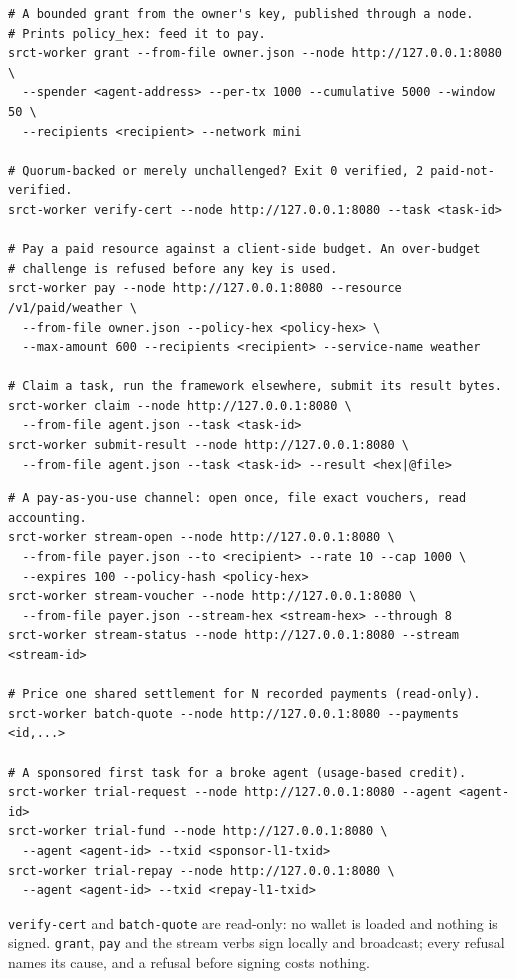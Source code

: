 \documentclass{article}
\begin{document}
\begin{verbatim}
# A bounded grant from the owner's key, published through a node.
# Prints policy_hex: feed it to pay.
srct-worker grant --from-file owner.json --node http://127.0.0.1:8080 \
  --spender <agent-address> --per-tx 1000 --cumulative 5000 --window 50 \
  --recipients <recipient> --network mini

# Quorum-backed or merely unchallenged? Exit 0 verified, 2 paid-not-verified.
srct-worker verify-cert --node http://127.0.0.1:8080 --task <task-id>

# Pay a paid resource against a client-side budget. An over-budget
# challenge is refused before any key is used.
srct-worker pay --node http://127.0.0.1:8080 --resource /v1/paid/weather \
  --from-file owner.json --policy-hex <policy-hex> \
  --max-amount 600 --recipients <recipient> --service-name weather

# Claim a task, run the framework elsewhere, submit its result bytes.
srct-worker claim --node http://127.0.0.1:8080 \
  --from-file agent.json --task <task-id>
srct-worker submit-result --node http://127.0.0.1:8080 \
  --from-file agent.json --task <task-id> --result <hex|@file>
\end{verbatim}

\begin{verbatim}
# A pay-as-you-use channel: open once, file exact vouchers, read accounting.
srct-worker stream-open --node http://127.0.0.1:8080 \
  --from-file payer.json --to <recipient> --rate 10 --cap 1000 \
  --expires 100 --policy-hash <policy-hex>
srct-worker stream-voucher --node http://127.0.0.1:8080 \
  --from-file payer.json --stream-hex <stream-hex> --through 8
srct-worker stream-status --node http://127.0.0.1:8080 --stream <stream-id>

# Price one shared settlement for N recorded payments (read-only).
srct-worker batch-quote --node http://127.0.0.1:8080 --payments <id,...>

# A sponsored first task for a broke agent (usage-based credit).
srct-worker trial-request --node http://127.0.0.1:8080 --agent <agent-id>
srct-worker trial-fund --node http://127.0.0.1:8080 \
  --agent <agent-id> --txid <sponsor-l1-txid>
srct-worker trial-repay --node http://127.0.0.1:8080 \
  --agent <agent-id> --txid <repay-l1-txid>
\end{verbatim}

\texttt{verify-cert} and \texttt{batch-quote} are read-only: no wallet is
loaded and nothing is signed. \texttt{grant}, \texttt{pay} and the stream
verbs sign locally and broadcast; every refusal names its cause, and a
refusal before signing costs nothing.
\end{document}
